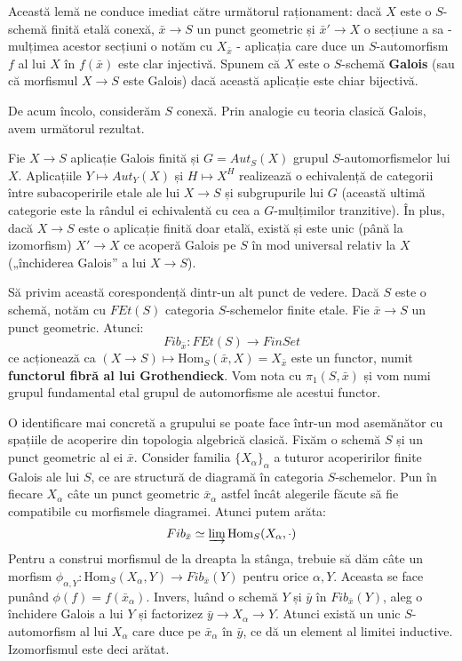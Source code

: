 \documentclass[13pt,openany]{book}
\begin{document}
Această lemă ne conduce imediat către următorul raționament: dacă $X$ este o $S$-schemă finită etală conexă, $\bar{x} \rightarrow S$ un punct geometric și $\bar{x}'\rightarrow X$ o secțiune a sa - mulțimea acestor secțiuni o notăm cu $X_{\bar{x}}$ - aplicația care duce un $S$-automorfism $f$ al lui $X$ în $f(\bar{x})$ este clar injectivă. Spunem că $X$ este o $S$-schemă {\bf Galois} (sau că morfismul $X \rightarrow S$ este Galois) dacă această aplicație este chiar bijectivă.

De acum încolo, considerăm $S$ conexă. Prin analogie cu teoria clasică Galois, avem următorul rezultat.

\begin{prop}
Fie $X \rightarrow S$ aplicație Galois finită și $G=Aut_S(X)$ grupul $S$-automorfismelor lui $X$. Aplicațiile $Y \mapsto Aut_Y(X)$ și $H \mapsto X^H$ realizează o echivalență de categorii între subacoperirile etale ale lui $X \rightarrow S$ și subgrupurile lui $G$ (această ultimă categorie este la rândul ei echivalentă cu cea a $G$-mulțimilor tranzitive). În plus, dacă $X \rightarrow S$ este o aplicație finită doar etală, există și este unic (până la izomorfism) $X' \rightarrow X$ ce acoperă Galois pe $S$ în mod universal relativ la $X$ („închiderea Galois” a lui $X \rightarrow S$).
\end{prop}

Să privim această corespondență dintr-un alt punct de vedere. Dacă $S$ este o schemă, notăm cu $FEt(S)$ categoria $S$-schemelor finite etale. Fie $\bar{x} \rightarrow S$ un punct geometric. Atunci:
$$Fib_{\bar{x}} : FEt(S) \rightarrow FinSet$$
ce acționează ca $(X \rightarrow S) \mapsto \text{Hom}_S(\bar{x},X)=X_{\bar{x}}$ este un functor, numit {\bf functorul fibră al lui Grothendieck}. Vom nota cu $\pi_1(S,\bar{x})$ și vom numi grupul fundamental etal grupul de automorfisme ale acestui functor.

O identificare mai concretă a grupului se poate face într-un mod asemănător cu spațiile de acoperire din topologia algebrică clasică. Fixăm o schemă $S$ și un punct geometric al ei $\bar{x}$. Consider familia $\{X_\alpha\}_\alpha$ a tuturor acoperirilor finite Galois ale lui $S$, ce are structură de diagramă în categoria $S$-schemelor. Pun în fiecare $X_\alpha$ câte un punct geometric $\bar{x}_\alpha$ astfel încât alegerile făcute să fie compatibile cu morfismele diagramei. Atunci putem arăta:
$$Fib_{\bar{x}} \simeq \varinjlim \text{Hom}_S(X_\alpha,\cdot)$$
Pentru a construi morfismul de la dreapta la stânga, trebuie să dăm câte un morfism $\phi_{\alpha,Y} : \text{Hom}_S(X_\alpha,Y) \rightarrow Fib_{\bar{x}}(Y)$ pentru orice $\alpha,Y$. Aceasta se face punând $\phi(f)=f(\bar{x}_\alpha)$. Invers, luând o schemă $Y$ și $\bar{y}$ în $Fib_{\bar{x}}(Y)$, aleg o închidere Galois a lui $Y$ și factorizez $\bar{y} \rightarrow X_\alpha \rightarrow Y$. Atunci există un unic $S$-automorfism al lui $X_\alpha$ care duce pe $\bar{x}_\alpha$ în $\bar{y}$, ce dă un element al limitei inductive. Izomorfismul este deci arătat.
\end{document}
